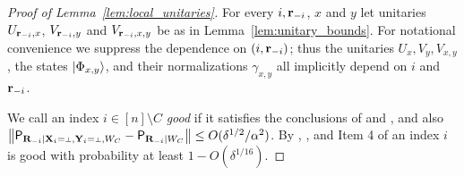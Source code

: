 \begin{proof}[Proof of Lemma~\ref{lem:local_unitaries}]
For every $i,\mathbf{r}_{-i}$, $x$ and $y$ let unitaries $U_{\mathbf{r}_{-i}, x}$, $V_{\mathbf{r}_{-i}, y}$ and $V_{{\mathbf{r}_{-i} , x,y}}$ be as in Lemma~\ref{lem:unitary_bounds}. For notational convenience we suppress the dependence on $(i, \mathbf{r}_{-i})$; thus the unitaries $U_x, V_y, V_{x,y}$, the states ${|\Phi_{x,y}\rangle}$, and their normalizations $\gamma_{x,y}$ all implicitly depend on $i$ and $\mathbf{r}_{-i}$. 

We call an index $i \in [n] \setminus C$ \emph{good} if it satisfies the conclusions of  and , and also $\left \| \P_{\bR_\mi | \bX_i = \dummy, \bY_i = \dummy,W_C} - \P_{\bR_\mi | W_C} \right \| \leq O(\delta^{1/2}/\alpha^2)$. By , , and Item 4 of  an index $i$ is good with probability at least $1 - O(\delta^{1/16})$.


\end{proof}
